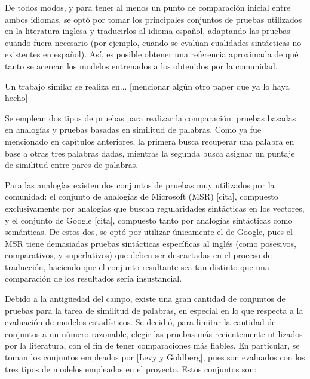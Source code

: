 De todos modos, y para tener al menos un punto de comparación inicial entre ambos idiomas, se optó
por tomar los principales conjuntos de pruebas utilizados en la literatura inglesa y traducirlos al
idioma español, adaptando las pruebas cuando fuera necesario (por ejemplo, cuando se evalúan
cualidades sintácticas no existentes en español). Así, es posible obtener una referencia aproximada
de qué tanto se acercan los modelos entrenados a los obtenidos por la comunidad.

Un trabajo similar se realiza en... [mencionar algún otro paper que ya lo haya hecho]

Se emplean dos tipos de pruebas para realizar la comparación: pruebas basadas en analogías y pruebas
basadas en similitud de palabras. Como ya fue mencionado en capítulos anteriores, la primera busca
recuperar una palabra en base a otras tres palabras dadas, mientras la segunda busca asignar un
puntaje de similitud entre pares de palabras.

Para las analogías existen dos conjuntos de pruebas muy utilizados por la comunidad: el conjunto de
analogías de Microsoft (MSR) [cita], compuesto exclusivamente por analogías que buscan regularidades
sintácticas en los vectores, y el conjunto de Google [cita], compuesto tanto por analogías
sintácticas como semánticas. De estos dos, se optó por utilizar únicamente el de Google, pues el
MSR tiene demasiadas pruebas sintácticas específicas al inglés (como posesivos, comparativos, y
superlativos) que deben ser descartadas en el proceso de traducción, haciendo que el conjunto
resultante sea tan distinto que una comparación de los resultados sería insustancial.

Debido a la antigüedad del campo, existe una gran cantidad de conjuntos de pruebas para la tarea de
similitud de palabras, en especial en lo que respecta a la evaluación de modelos estadísticos. Se
decidió, para limitar la cantidad de conjuntos a un número razonable, elegir las pruebas más
recientemente utilizados por la literatura, con el fin de tener comparaciones más fiables. En
particular, se toman los conjuntos empleados por [Levy y Goldberg], pues son evaluados con los tres
tipos de modelos empleados en el proyecto. Estos conjuntos son:

